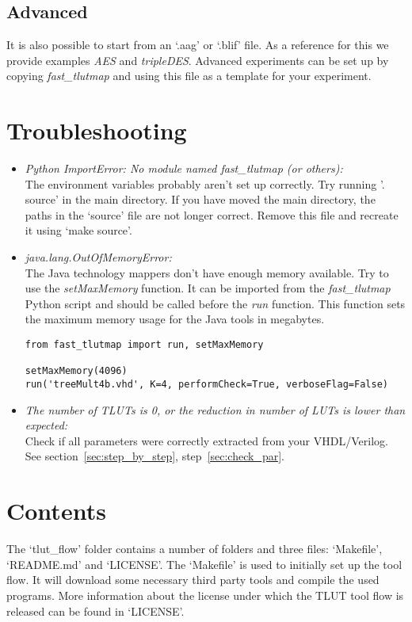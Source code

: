 \documentclass[a4paper,oneside]{memoir}
\begin{document}
\section{Advanced}
It is also possible to start from an `.aag' or `.blif' file. As a reference for this we provide examples \emph{AES} and \emph{tripleDES}. 
Advanced experiments can be set up by copying \emph{fast\_tlutmap} and using this file as a template for your experiment.

\clearpage
\chapter{Troubleshooting}\label{sec:troubleshooting}
\begin{itemize}
\item \emph{Python ImportError: No module named fast\_tlutmap (or others):}\\
The environment variables probably aren't set up correctly. Try running '. source' in the main directory. 
If you have moved the main directory, the paths in the `source' file are not longer correct. Remove this file and recreate it using `make source'.

\item \emph{java.lang.OutOfMemoryError:}\\
The Java technology mappers don't have enough memory available. Try to use the \emph{setMaxMemory} function. It can be imported from the \emph{fast\_tlutmap} Python script and should be called before the \emph{run} function. This function sets the maximum memory usage for the Java tools in megabytes.
\lstset{language=python}
\begin{lstlisting}
from fast_tlutmap import run, setMaxMemory

setMaxMemory(4096)
run('treeMult4b.vhd', K=4, performCheck=True, verboseFlag=False)
\end{lstlisting}

\item \emph{The number of TLUTs is 0, or the reduction in number of LUTs is lower than expected:}\\
Check if all parameters were correctly extracted from your VHDL/Verilog. See section~\ref{sec:step_by_step}, step~\ref{sec:check_par}.
\end{itemize}

\clearpage
\chapter{Contents}\label{sec:contents}
The `tlut\_flow' folder contains a number of folders and three files: `Makefile', `README.md' and `LICENSE'. 
The `Makefile' is used to initially set up the tool flow. It will download  some necessary third party tools and compile the used programs.
More information about the license under which the TLUT tool flow is released can be found in `LICENSE'.
\end{document}
